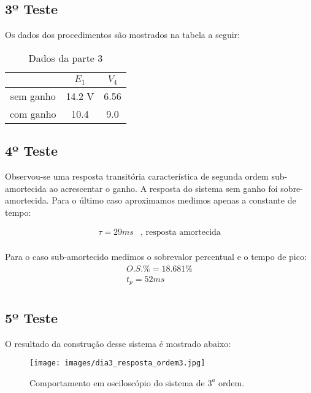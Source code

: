 \subsection{3º Teste}
Os dados dos procedimentos são mostrados na tabela a seguir:

\begin{table}[H]
\centering
\begin{tabular}{|c|c|c|}
\hline
			& $E_{1}$ & $V_4$\\  \hline
sem ganho 	& 14.2 V & 6.56 \\ \hline
com ganho 	& 10.4   & 9.0 \\ \hline
\end{tabular}
\caption{Dados da parte 3}
\label{tab:teste3}
\end{table}

\subsection{4º Teste}
Observou-se uma resposta transitória característica de segunda ordem sub-amortecida ao acrescentar o ganho. A resposta do sistema sem ganho foi sobre-amortecida. Para o último caso aproximamos medimos apenas a constante de tempo:

\begin{equation}
\begin{array}{cc}
    \boxed{\tau = 29 ms} & \mbox{, resposta amortecida} \\
\end{array}
\end{equation}

Para o caso sub-amortecido medimos o sobrevalor percentual e o tempo de pico:
\begin{equation}
\begin{array}{l}
    O.S. \% = 18.681 \% \\
    t_p = 52 ms \\
\end{array}
\end{equation}

\subsection{5º Teste}
O resultado da construção desse sistema é mostrado abaixo:\\

\begin{figure}[H]
  \centering
	\texttt{[image: images/dia3\_resposta\_ordem3.jpg]}
\caption{Comportamento em osciloscópio do sistema de $3^a$ ordem.}
\label{fig:3a-ordem-response}
\end{figure}